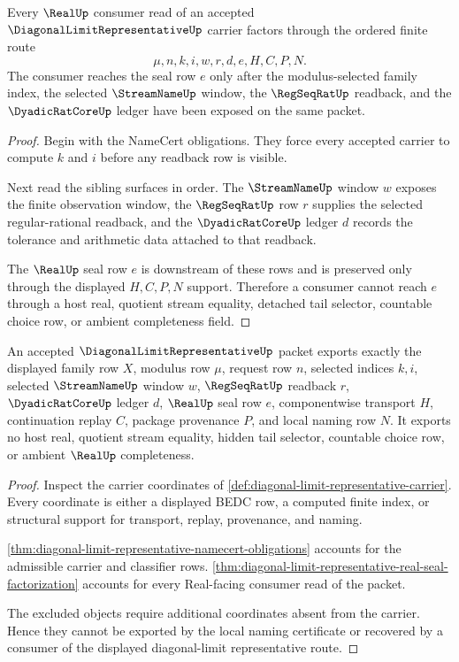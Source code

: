 \begin{theorem}
\label{thm:diagonal-limit-representative-real-seal-factorization}
Every $\RealUp$ consumer read of an accepted $\DiagonalLimitRepresentativeUp$ carrier factors through the ordered finite route
$$
\mu,n,k,i,w,r,d,e,H,C,P,N.
$$
The consumer reaches the seal row $e$ only after the modulus-selected family index, the selected $\StreamNameUp$ window, the $\RegSeqRatUp$ readback, and the $\DyadicRatCoreUp$ ledger have been exposed on the same packet.
\end{theorem}
\begin{proof}
Begin with the NameCert obligations. They force every accepted carrier to compute $k$ and $i$ before any readback row is visible.

Next read the sibling surfaces in order. The $\StreamNameUp$ window $w$ exposes the finite observation window, the $\RegSeqRatUp$ row $r$ supplies the selected regular-rational readback, and the $\DyadicRatCoreUp$ ledger $d$ records the tolerance and arithmetic data attached to that readback.

The $\RealUp$ seal row $e$ is downstream of these rows and is preserved only through the displayed $H,C,P,N$ support. Therefore a consumer cannot reach $e$ through a host real, quotient stream equality, detached tail selector, countable choice row, or ambient completeness field.
\end{proof}

\begin{theorem}
\label{thm:diagonal-limit-representative-nonchoice-boundary}
An accepted $\DiagonalLimitRepresentativeUp$ packet exports exactly the displayed family row $X$, modulus row $\mu$, request row $n$, selected indices $k,i$, selected $\StreamNameUp$ window $w$, $\RegSeqRatUp$ readback $r$, $\DyadicRatCoreUp$ ledger $d$, $\RealUp$ seal row $e$, componentwise transport $H$, continuation replay $C$, package provenance $P$, and local naming row $N$. It exports no host real, quotient stream equality, hidden tail selector, countable choice row, or ambient $\RealUp$ completeness.
\end{theorem}
\begin{proof}
Inspect the carrier coordinates of \autoref{def:diagonal-limit-representative-carrier}. Every coordinate is either a displayed BEDC row, a computed finite index, or structural support for transport, replay, provenance, and naming.

\autoref{thm:diagonal-limit-representative-namecert-obligations} accounts for the admissible carrier and classifier rows. \autoref{thm:diagonal-limit-representative-real-seal-factorization} accounts for every Real-facing consumer read of the packet.

The excluded objects require additional coordinates absent from the carrier. Hence they cannot be exported by the local naming certificate or recovered by a consumer of the displayed diagonal-limit representative route.
\end{proof}

